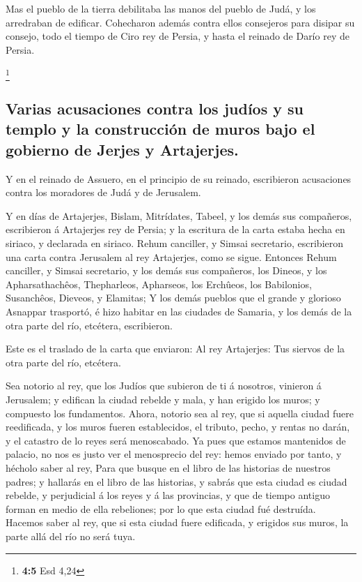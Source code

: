  Mas el pueblo de la tierra debilitaba las manos del pueblo
de Judá, y los arredraban de edificar.  Cohecharon además
contra ellos consejeros para disipar su consejo, todo el tiempo de Ciro
rey de Persia, y hasta el reinado de Darío rey de Persia.

\footnote{\textbf{4:5} Esd 4,24}

\hypertarget{varias-acusaciones-contra-los-juduxedos-y-su-templo-y-la-construcciuxf3n-de-muros-bajo-el-gobierno-de-jerjes-y-artajerjes.}{%
\subsection{Varias acusaciones contra los judíos y su templo y la
construcción de muros bajo el gobierno de Jerjes y
Artajerjes.}\label{varias-acusaciones-contra-los-juduxedos-y-su-templo-y-la-construcciuxf3n-de-muros-bajo-el-gobierno-de-jerjes-y-artajerjes.}}

 Y en el reinado de Assuero, en el principio de su reinado,
escribieron acusaciones contra los moradores de Judá y de Jerusalem.

 Y en días de Artajerjes, Bislam, Mitrídates, Tabeel, y los
demás sus compañeros, escribieron á Artajerjes rey de Persia; y la
escritura de la carta estaba hecha en siriaco, y declarada en siriaco.
 Rehum canciller, y Simsai secretario, escribieron una carta
contra Jerusalem al rey Artajerjes, como se sigue.  Entonces
Rehum canciller, y Simsai secretario, y los demás sus compañeros, los
Dineos, y los Apharsathachêos, Thepharleos, Apharseos, los Erchûeos, los
Babilonios, Susanchêos, Dieveos, y Elamitas;  Y los demás
pueblos que el grande y glorioso Asnappar trasportó, é hizo habitar en
las ciudades de Samaria, y los demás de la otra parte del río, etcétera,
escribieron.

 Este es el traslado de la carta que enviaron: Al rey
Artajerjes: Tus siervos de la otra parte del río, etcétera.

 Sea notorio al rey, que los Judíos que subieron de ti á
nosotros, vinieron á Jerusalem; y edifican la ciudad rebelde y mala, y
han erigido los muros; y compuesto los fundamentos.  Ahora,
notorio sea al rey, que si aquella ciudad fuere reedificada, y los muros
fueren establecidos, el tributo, pecho, y rentas no darán, y el catastro
de lo reyes será menoscabado.  Ya pues que estamos
mantenidos de palacio, no nos es justo ver el menosprecio del rey: hemos
enviado por tanto, y hécholo saber al rey,  Para que busque
en el libro de las historias de nuestros padres; y hallarás en el libro
de las historias, y sabrás que esta ciudad es ciudad rebelde, y
perjudicial á los reyes y á las provincias, y que de tiempo antiguo
forman en medio de ella rebeliones; por lo que esta ciudad fué
destruída.  Hacemos saber al rey, que si esta ciudad fuere
edificada, y erigidos sus muros, la parte allá del río no será tuya.

